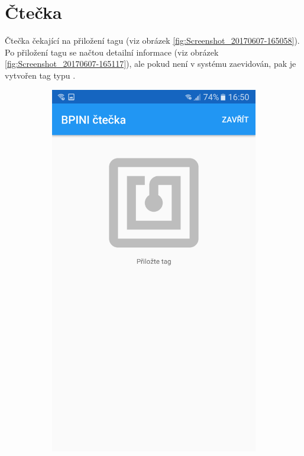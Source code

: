 \documentclass[12pt]{report}
\begin{document}
\section{Čtečka}
Čtečka čekající na přiložení tagu (viz obrázek \ref{fig:Screenshot_20170607-165058}).
Po přiložení tagu se načtou detailní informace (viz obrázek \ref{fig:Screenshot_20170607-165117}), ale pokud není v systému zaevidován, pak je vytvořen tag typu .
\begin{figure}[H]
	\centering
  \begin{subfigure}[b]{0.3\textwidth}
    \centering
	\includegraphics[width=\textwidth]{../images/client_android/Screenshot_20170607-165058.png}	

\end{subfigure}
\end{figure}
\end{document}
